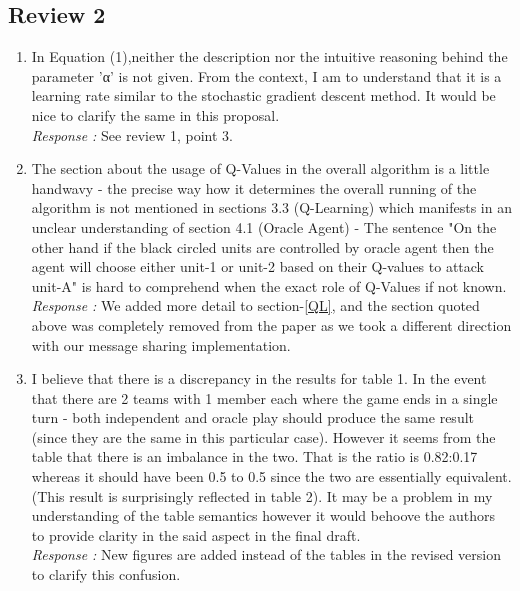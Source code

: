 \subsection{Review 2}
\begin{enumerate}
\item In Equation (1),neither the description nor the intuitive reasoning behind the parameter 'α' is not given. From the context, I am to understand that it is a learning rate similar to the stochastic gradient descent method. It would be nice to clarify the same in this proposal.  %
\\{\it Response : }See review 1, point 3.

\item The section about the usage of Q-Values in the overall algorithm is a little handwavy - the precise way how it determines the overall running of the algorithm is not mentioned in sections 3.3 (Q-Learning) which manifests in an unclear understanding of section 4.1 (Oracle Agent) - The sentence "On the other hand if the black circled units are controlled by oracle agent then the agent will choose either unit-1 or unit-2 based on their Q-values to attack unit-A" is hard to comprehend when the exact role of Q-Values if not known. 
\\{\it Response : } We added more detail to section-\ref{QL}, and the section quoted above was completely removed from the paper as we took a different direction with our message sharing implementation.


\item I believe that there is a discrepancy in the results for table 1. In the event that there are 2 teams with 1 member each where the game ends in a single turn - both independent and oracle play should produce the same result (since they are the same in this particular case). However it seems from the table that there is an imbalance in the two. That is the ratio is 0.82:0.17 whereas it should have been 0.5 to 0.5 since the two are essentially equivalent. (This result is surprisingly reflected in table 2). It may be a problem in my understanding of the table semantics however it would behoove the authors to provide clarity in the said aspect in the final draft. 
\\{\it Response : }New figures are added instead of the tables in the revised version to clarify this confusion.



\end{enumerate}

